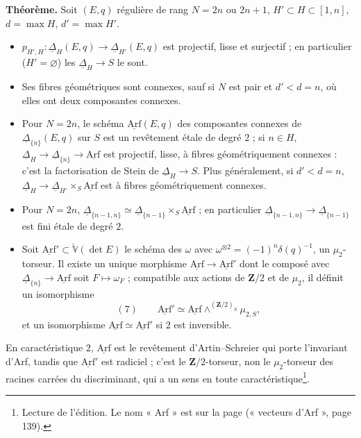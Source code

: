\documentclass[11pt,a4paper]{article}
\begin{document}
\textbf{Théorème.} Soit $(E, q)$ régulière de rang $N = 2n$ ou $2n + 1$, $H' \subset H
\subset [1, n]$, $d = \max H$, $d' = \max H'$.
\begin{itemize}
  \item[a)] $p_{H', H} : \underline{\Delta}_H(E, q) \to \underline{\Delta}_{H'}(E, q)$ est
    projectif, lisse et surjectif ; en particulier ($H' = \varnothing$) les
    $\underline{\Delta}_H \to S$ le sont.
  \item[b)] Ses fibres géométriques sont connexes, sauf si $N$ est pair et $d' < d =
    n$, où elles ont deux composantes connexes.
  \item[c)] Pour $N = 2n$, le schéma $\underline{\mathrm{Arf}}(E, q)$ des composantes
    connexes de $\underline{\Delta}_{\{n\}}(E, q)$ sur $S$ est un revêtement étale de
    degré $2$ ; si $n \in H$, $\underline{\Delta}_H \to \underline{\Delta}_{\{n\}} \to
    \underline{\mathrm{Arf}}$ est projectif, lisse, à fibres géométriquement connexes :
    c'est la factorisation de Stein de $\underline{\Delta}_H \to S$. Plus généralement,
    si $d' < d = n$, $\underline{\Delta}_H \to \underline{\Delta}_{H'} \times_S
    \underline{\mathrm{Arf}}$ est à fibres géométriquement connexes.
  \item[d)] Pour $N = 2n$, $\underline{\Delta}_{\{n-1, n\}} \simeq
    \underline{\Delta}_{\{n-1\}} \times_S \underline{\mathrm{Arf}}$ ; en particulier
    $\underline{\Delta}_{\{n-1, n\}} \to \underline{\Delta}_{\{n-1\}}$ est fini étale de
    degré $2$.
  \item[e)] Soit $\underline{\mathrm{Arf}}' \subset \check{\mathbb{V}}(\det E)$ le schéma
    des $\omega$ avec $\omega^{\otimes 2} = (-1)^n\delta(q)^{-1}$, un $\mu_2$-torseur. Il
    existe un unique morphisme $\underline{\mathrm{Arf}} \to \underline{\mathrm{Arf}}'$ dont
    le composé avec $\underline{\Delta}_{\{n\}} \to \underline{\mathrm{Arf}}$ soit $F \mapsto
    \omega_F$ ; compatible aux actions de $\mathbf{Z}/2$ et de $\mu_2$, il définit un
    isomorphisme
    \[
      (7) \qquad \underline{\mathrm{Arf}}' \simeq \underline{\mathrm{Arf}}
      \wedge^{(\mathbf{Z}/2)_S} \mu_{2,S},
    \]
    et un isomorphisme $\underline{\mathrm{Arf}} \simeq \underline{\mathrm{Arf}}'$ si $2$
    est inversible.
\end{itemize}
En caractéristique $2$, $\underline{\mathrm{Arf}}$ est le revêtement d'Artin--Schreier qui
porte l'invariant d'Arf, tandis que $\underline{\mathrm{Arf}}'$ est radiciel ; c'est le
$\mathbf{Z}/2$-torseur, non le $\mu_2$-torseur des racines carrées du discriminant, qui
a un sens en toute caractéristique\footnote{Lecture de l'édition. Le nom
« Arf » est sur la page (« vecteurs d'Arf », page 139).}.
\end{document}
